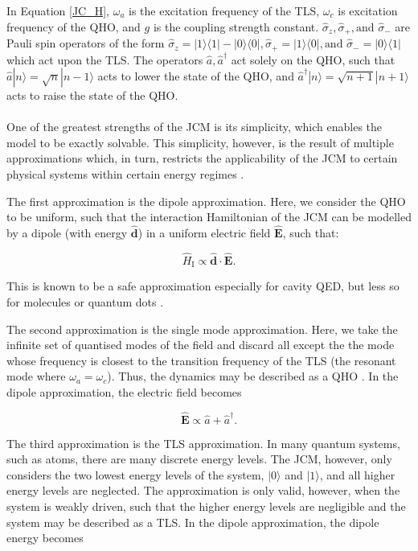 \documentclass[12pt]{article}
\begin{document}
In Equation \eqref{JC_H}, $\omega_a$ is the excitation frequency of the TLS, $\omega_c$ is excitation frequency of the QHO, and $g$ is the coupling strength constant. $\hat{\sigma}_z, \hat{\sigma}_+, \text{and } \hat{\sigma}_-$ are Pauli spin operators of the form $\hat{\sigma}_z = |1\rangle\langle1| - |0\rangle\langle0|, \hat{\sigma}_+ = |1\rangle\langle0|, \text{and } \hat{\sigma}_- = |0\rangle\langle1|$ which act upon the TLS. The operators $\hat{a}, \hat{a}^\dagger$ act solely on the QHO, such that $\hat{a}|n\rangle = \sqrt{n}|n-1\rangle$ acts to lower the state of the QHO, and $\hat{a}^{\dagger}|n\rangle = \sqrt{n+1}|n+1\rangle$ acts to raise the state of the QHO.\\
\\
One of the greatest strengths of the JCM is its simplicity, which enables the model to be exactly solvable. This simplicity, however, is the result of multiple approximations which, in turn, restricts the applicability of the JCM to certain physical systems within certain energy regimes \cite{General2024-JC_overview}. 

The first approximation is the dipole approximation. Here, we consider the QHO to be uniform, such that the interaction Hamiltonian of the JCM can be modelled by a dipole (with energy $\boldsymbol{\hat{d}}$) in a uniform electric field $\boldsymbol{\hat{E}}$, such that:

\begin{equation*}
    \hat{H}_{\scriptscriptstyle \text{I}} \propto \boldsymbol{\hat{d}} \cdot \boldsymbol{\hat{E}}.
\end{equation*}

This is known to be a safe approximation especially for cavity QED, but less so for molecules or quantum dots \cite{General2024-JCM_relevance}. 

The second approximation is the single mode approximation. Here, we take the infinite set of quantised modes of the field and discard all except the the mode whose frequency is closest to the transition frequency of the TLS (the resonant mode where $\omega_a = \omega_c$). Thus, the dynamics may be described as a QHO \cite{General2024-JCM_relevance}. In the dipole approximation, the electric field becomes

\begin{equation*}
    \boldsymbol{\hat{E}}  \propto \hat{a} + \hat{a}^\dagger.
\end{equation*}


The third approximation is the TLS approximation. In many quantum systems, such as atoms, there are many discrete energy levels. The JCM, however, only considers the two lowest energy levels of the system, $|0\rangle$ and $|1\rangle$, and all higher energy levels are neglected. The approximation is only valid, however, when the system is weakly driven, such that the higher energy levels are negligible and the system may be described as a TLS. In the dipole approximation, the dipole energy becomes
\end{document}
